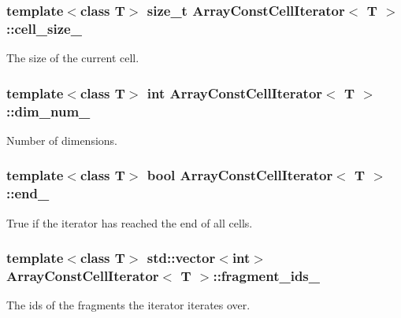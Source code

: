 \subsubsection[{cell\+\_\+size\+\_\+}]{\setlength{\rightskip}{0pt plus 5cm}template$<$class T$>$ size\+\_\+t {\bf Array\+Const\+Cell\+Iterator}$<$ T $>$\+::cell\+\_\+size\+\_\+\hspace{0.3cm}{\ttfamily [private]}}\label{classArrayConstCellIterator_a91da6e73446e17b4c1d2b3670b2c4ec8}
The size of the current cell. \hypertarget{classArrayConstCellIterator_ac7704577ee8c7a4dd35185576929d69a}{}
\subsubsection[{dim\+\_\+num\+\_\+}]{\setlength{\rightskip}{0pt plus 5cm}template$<$class T$>$ int {\bf Array\+Const\+Cell\+Iterator}$<$ T $>$\+::dim\+\_\+num\+\_\+\hspace{0.3cm}{\ttfamily [private]}}\label{classArrayConstCellIterator_ac7704577ee8c7a4dd35185576929d69a}
Number of dimensions. \hypertarget{classArrayConstCellIterator_a61b460f93249e972571c4fd3e97b9c4a}{}
\subsubsection[{end\+\_\+}]{\setlength{\rightskip}{0pt plus 5cm}template$<$class T$>$ bool {\bf Array\+Const\+Cell\+Iterator}$<$ T $>$\+::end\+\_\+\hspace{0.3cm}{\ttfamily [private]}}\label{classArrayConstCellIterator_a61b460f93249e972571c4fd3e97b9c4a}
True if the iterator has reached the end of all cells. \hypertarget{classArrayConstCellIterator_a46c2ac214d4878e67c8335202fcd102c}{}
\subsubsection[{fragment\+\_\+ids\+\_\+}]{\setlength{\rightskip}{0pt plus 5cm}template$<$class T$>$ std\+::vector$<$int$>$ {\bf Array\+Const\+Cell\+Iterator}$<$ T $>$\+::fragment\+\_\+ids\+\_\+\hspace{0.3cm}{\ttfamily [private]}}\label{classArrayConstCellIterator_a46c2ac214d4878e67c8335202fcd102c}
The ids of the fragments the iterator iterates over. \hypertarget{classArrayConstCellIterator_a4f3c802c4e8f89df32e405d094608776}{}
